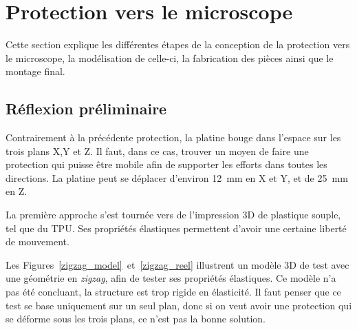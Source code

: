 \section{Protection vers le microscope}
Cette section explique les différentes étapes de la conception de la protection vers le microscope, la modélisation de celle-ci, la fabrication des pièces ainsi que le montage final.
\subsection{Réflexion préliminaire}
Contrairement à la précédente protection, la platine bouge dans l'espace sur les trois plans X,Y et Z. Il faut, dans ce cas, trouver un moyen de faire une protection qui puisse être mobile afin de supporter les efforts dans toutes les directions. La platine peut se déplacer d'environ 12~mm en X et Y, et de 25~mm en Z.

La première approche s'est tournée vers de l'impression 3D de plastique souple, tel que du TPU. Ses propriétés élastiques permettent d'avoir une certaine liberté de mouvement.

Les Figures~\ref{zigzag_model}~et~\ref{zigzag_reel} illustrent un modèle 3D de test avec une géométrie en \textit{zigzag}, afin de tester ses propriétés élastiques. Ce modèle n'a pas été concluant, la structure est trop rigide en élasticité. Il faut penser que ce test se base uniquement sur un seul plan, donc si on veut avoir une protection qui se déforme sous les trois plans, ce n'est pas la bonne solution.

